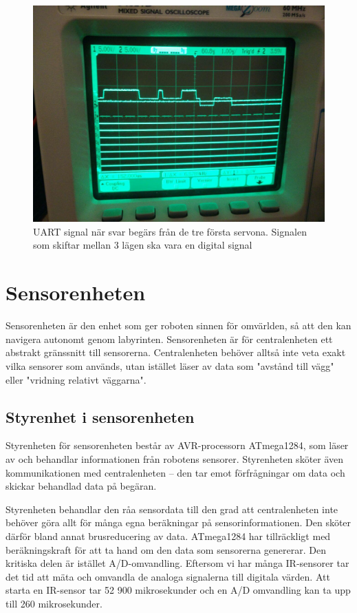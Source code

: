 \documentclass[a4paper,titlepage,12pt]{article}
\begin{document}
	\begin{figure}[htpb]
		\centering
		\includegraphics[width=0.8\linewidth]{images/uart_tri_state.jpg}
		\caption{UART signal när svar begärs från de tre första servona. 
			Signalen som skiftar mellan 3 lägen ska vara en digital signal}
		\label{fig:servo_tri_state_bug}
	\end{figure}


	\section{Sensorenheten}
	Sensorenheten är den enhet som ger roboten sinnen för omvärlden, så att den
	kan navigera autonomt genom labyrinten. Sensorenheten är för
	centralenheten ett abstrakt gränssnitt till sensorerna. Centralenheten
	behöver alltså inte veta exakt vilka sensorer som används, utan istället
	läser av data som "avstånd till vägg" eller "vridning relativt väggarna".

	\subsection{Styrenhet i sensorenheten}
	Styrenheten för sensorenheten består av AVR-processorn ATmega1284, som läser av och 
	behandlar informationen från robotens sensorer. Styrenheten sköter även
	kommunikationen med centralenheten -- den tar emot förfrågningar om data och
	skickar behandlad data på begäran.

	Styrenheten behandlar den råa sensordata till den grad att
	centralenheten inte behöver göra allt för många egna beräkningar på
	sensorinformationen. Den sköter därför bland annat brusreducering av
	data. ATmega1284 har tillräckligt med 
	beräkningskraft för att ta hand om den data som sensorerna genererar. Den kritiska 
	delen är istället A/D-omvandling. Eftersom vi har många IR-sensorer tar det tid att 
	mäta och omvandla de analoga signalerna till digitala värden. Att starta en IR-sensor 
	tar 52 900 mikrosekunder och en A/D omvandling kan ta upp till 260 mikrosekunder. 
\end{document}
